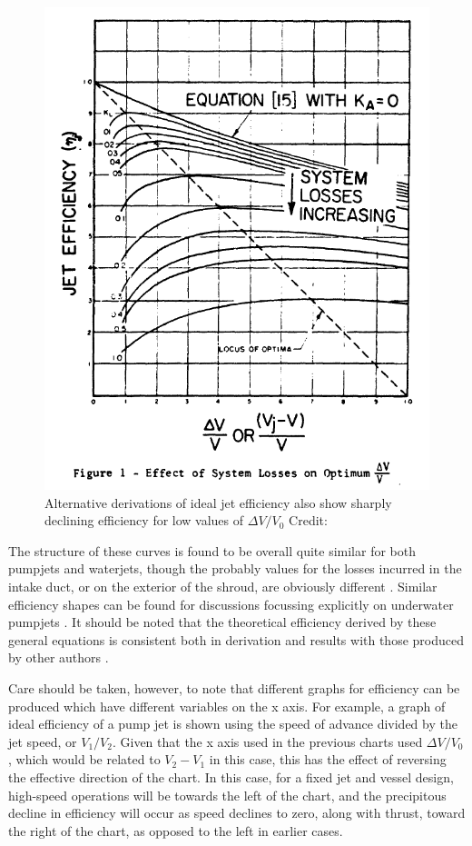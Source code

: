 \documentclass{article}\usepackage[]{graphicx}\usepackage[]{color}
\begin{document}
\begin{figure}
\includegraphics[width=\textwidth]{EfficiencyBrandau.png}
\caption{Alternative derivations of ideal jet efficiency also show sharply declining efficiency for low values of $\Delta V / V_0$ Credit: \cite{brandau1967}}
\label{fig:EfficiencyBrandau.png}
\end{figure}

The structure of these curves is found to be overall quite similar for both pumpjets and waterjets, though the probably values for the losses incurred in the intake duct, or on the exterior of the shroud, are obviously different \parencite[13-14]{wislicenus1973}.  Similar efficiency shapes can be found for discussions focussing explicitly on underwater pumpjets \parencite[13]{henderson1964}. It should be noted that the theoretical efficiency derived by these general equations is consistent both in derivation and results with those produced by other authors \parencite[227]{lewis1988}.

Care should be taken, however, to note that different graphs for efficiency can be produced which have different variables on the x axis.  For example, \cite[247]{mollard2011} a graph of ideal efficiency of a pump jet is shown using the speed of advance divided by the jet speed, or $V_1/V_2$.  Given that the x axis used in the previous charts used $\Delta V / V_0$, which would be related to $V_2-V_1$ in this case, this has the effect of reversing the effective direction of the chart. In this case, for a fixed jet and vessel design, high-speed operations will be towards the left of the chart, and the precipitous decline in efficiency will occur as speed declines to zero, along with thrust, toward the right of the chart, as opposed to the left in earlier cases.
\end{document}
